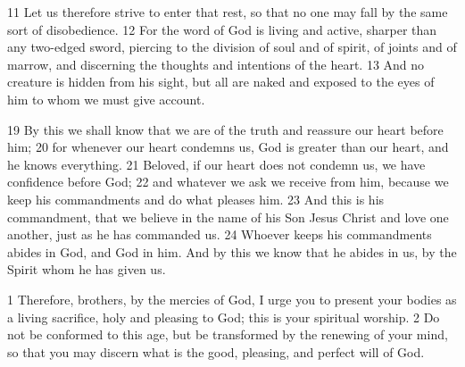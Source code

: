 \begin{bible}
11 Let us therefore strive to enter that rest, so that no one may fall by the same sort of disobedience. 12 For the word of God is living and active, sharper than any two-edged sword, piercing to the division of soul and of spirit, of joints and of marrow, and discerning the thoughts and intentions of the heart. 13 And no creature is hidden from his sight, but all are naked and exposed to the eyes of him to whom we must give account.

19 By this we shall know that we are of the truth and reassure our heart before him; 20 for whenever our heart condemns us, God is greater than our heart, and he knows everything. 21 Beloved, if our heart does not condemn us, we have confidence before God; 22 and whatever we ask we receive from him, because we keep his commandments and do what pleases him. 23 And this is his commandment, that we believe in the name of his Son Jesus Christ and love one another, just as he has commanded us. 24 Whoever keeps his commandments abides in God, and God in him. And by this we know that he abides in us, by the Spirit whom he has given us.

1 Therefore, brothers, by the mercies of God, I urge you to present your bodies as a living sacrifice, holy and pleasing to God; this is your spiritual worship. 2 Do not be conformed to this age, but be transformed by the renewing of your mind, so that you may discern what is the good, pleasing, and perfect will of God.

\end{bible}


